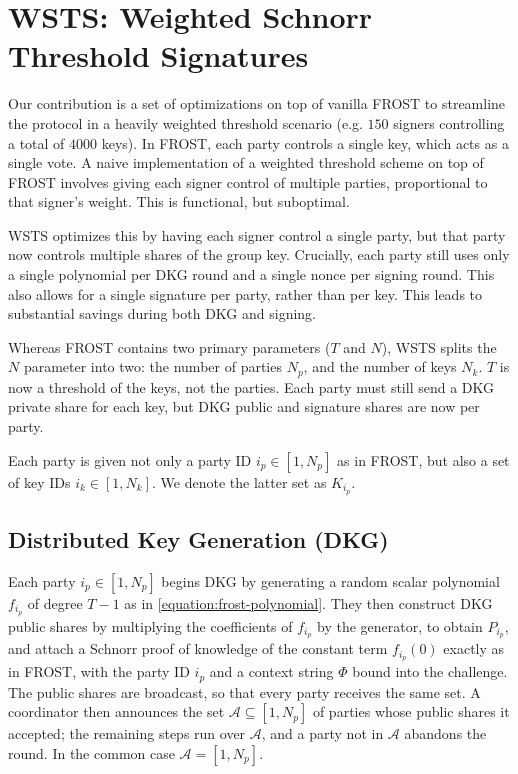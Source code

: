 \documentclass{article}
\theoremstyle{plain}
\theoremstyle{definition}
\theoremstyle{remark}
\begin{document}
\section{
  WSTS: Weighted Schnorr Threshold Signatures
}

Our contribution is a set of optimizations on top of vanilla FROST to streamline the protocol in a heavily weighted threshold scenario (e.g. $150$ signers controlling a total of $4000$ keys). In FROST, each party controls a single key, which acts as a single vote.  A naive implementation of a weighted threshold scheme on top of FROST involves giving each signer control of multiple parties, proportional to that signer's weight.  This is functional, but suboptimal.

WSTS optimizes this by having each signer control a single party, but that party now controls multiple shares of the group key.  Crucially, each party still uses only a single polynomial per DKG round and a single nonce per signing round.  This also allows for a single signature per party, rather than per key.  This leads to substantial savings during both DKG and signing.

Whereas FROST contains two primary parameters ($T$ and $N$), WSTS splits the $N$ parameter into two: the number of parties $N_p$, and the number of keys $N_k$.  $T$ is now a threshold of the keys, not the parties.  Each party must still send a DKG private share for each key, but DKG public and signature shares are now per party.

Each party is given not only a party ID $i_p \in [1, N_p]$ as in FROST, but also a set of key IDs $i_k \in [1, N_k]$.  We denote the latter set as $K_{i_p}$.

\subsection{
  Distributed Key Generation (DKG)
}\label{section:wsts-dkg}

Each party $i_p \in [1, N_p]$ begins DKG by generating a random scalar polynomial $f_{i_p}$ of degree $T-1$ as in \eqref{equation:frost-polynomial}.  They then construct DKG public shares by multiplying the coefficients of $f_{i_p}$ by the generator, to obtain $P_{i_p}$, and attach a Schnorr proof of knowledge of the constant term $f_{i_p}(0)$ exactly as in FROST, with the party ID $i_p$ and a context string $\Phi$ bound into the challenge.  The public shares are broadcast, so that every party receives the same set.  A coordinator then announces the set $\mathcal{A} \subseteq [1, N_p]$ of parties whose public shares it accepted; the remaining steps run over $\mathcal{A}$, and a party not in $\mathcal{A}$ abandons the round.  In the common case $\mathcal{A} = [1, N_p]$.
\end{document}
